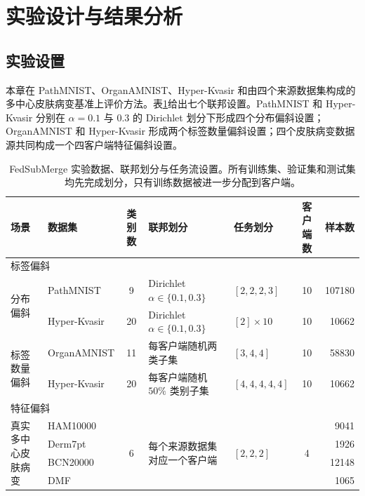 \section{实验设计与结果分析}
\label{sec:fedsubmerge-experiments}

\subsection{实验设置}
\label{subsec:fedsubmerge-experimental-setup}

本章在 PathMNIST、OrganAMNIST、Hyper-Kvasir 和由四个来源数据集构成的多中心皮肤病变基准上评价方法\cite{yang2023medmnist,borgli2020hyperkvasir,tschandl2018ham10000,kawahara2019derm7pt,combalia2019bcn20000,ballerini2013dermofit}。表\ref{tab:fedsubmerge-setup}给出七个联邦设置。PathMNIST 和 Hyper-Kvasir 分别在 $\alpha=0.1$ 与 $0.3$ 的 Dirichlet 划分下形成四个分布偏斜设置；OrganAMNIST 和 Hyper-Kvasir 形成两个标签数量偏斜设置；四个皮肤病变数据源共同构成一个四客户端特征偏斜设置。

\begin{table}[htbp]
\centering
\caption{FedSubMerge 实验数据、联邦划分与任务流设置。所有训练集、验证集和测试集均先完成划分，只有训练数据被进一步分配到客户端。}
\label{tab:fedsubmerge-setup}
\thesistablefont
\setlength{\tabcolsep}{3pt}
\renewcommand{\arraystretch}{1.15}
\begin{tabular}{@{}p{1.4cm}p{2.55cm}cp{3.1cm}p{1.85cm}cr@{}}
\toprule
场景 & 数据集 & 类别数 & 联邦划分 & 任务划分 & 客户端数 & 样本数 \\
\midrule
\multicolumn{7}{l}{标签偏斜} \\
\multirow{2}{1.4cm}{分布偏斜} & PathMNIST & 9 & Dirichlet $\alpha\in\{0.1,0.3\}$ & $[2,2,2,3]$ & 10 & 107180 \\
& Hyper-Kvasir & 20 & Dirichlet $\alpha\in\{0.1,0.3\}$ & $[2]\times10$ & 10 & 10662 \\
\multirow{2}{1.4cm}{标签数量偏斜} & OrganAMNIST & 11 & 每客户端随机两类子集 & $[3,4,4]$ & 10 & 58830 \\
& Hyper-Kvasir & 20 & 每客户端随机 $50\%$ 类别子集 & $[4,4,4,4,4]$ & 10 & 10662 \\
\midrule
\multicolumn{7}{l}{特征偏斜} \\
\multirow{4}{1.4cm}{真实多中心皮肤病变} & HAM10000 & \multirow{4}{*}{6} & \multirow{4}{3.1cm}{每个来源数据集对应一个客户端} & \multirow{4}{*}{$[2,2,2]$} & \multirow{4}{*}{4} & 9041 \\
& Derm7pt & & & & & 1926 \\
& BCN20000 & & & & & 12148 \\
& DMF & & & & & 1065 \\
\bottomrule
\end{tabular}%

\end{table}

